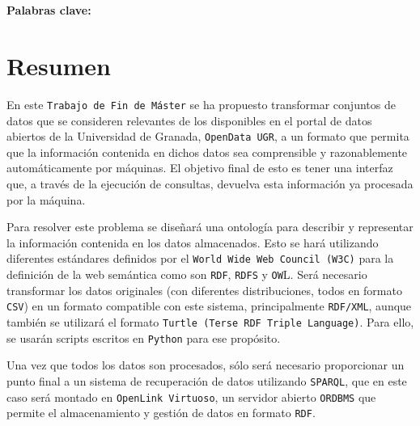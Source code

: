 \begin{center}
{\LARGE\bfseries\titulo}\\
\end{center}
\begin{center}
\autor\
\end{center}

\textbf{Palabras clave: }{\keywordsEs}

\section*{Resumen}


En este {\tt Trabajo de Fin de Máster} se ha propuesto transformar conjuntos de datos que se consideren relevantes de los disponibles en el portal de datos abiertos de la {Universidad de Granada}, {\tt OpenData UGR}, a un formato que permita que la información contenida en dichos datos sea comprensible y razonablemente automáticamente por máquinas. El objetivo final de esto es tener una interfaz que, a través de la ejecución de consultas, devuelva esta información ya procesada por la máquina.

\bigskip
Para resolver este problema se diseñará una ontología para describir y representar la información contenida en los datos almacenados. Esto se hará utilizando diferentes estándares definidos por el {\tt World Wide Web Council (W3C)} para la definición de la web semántica como son {\tt RDF}, {\tt RDFS} y {\tt OW}L. Será necesario transformar los datos originales (con diferentes distribuciones, todos en formato {\tt CSV}) en un formato compatible con este sistema, principalmente {\tt RDF/XML}, aunque también se utilizará el formato {\tt Turtle (Terse RDF Triple Language)}. Para ello, se usarán scripts escritos en {\tt Python} para ese propósito.

\bigskip
Una vez que todos los datos son procesados, sólo será necesario proporcionar un punto final a un sistema de recuperación de datos utilizando {\tt SPARQL}, que en este caso será montado en {\tt OpenLink Virtuoso}, un servidor abierto {\tt ORDBMS} que permite el almacenamiento y gestión de datos en formato {\tt RDF}.

\newpage
\begin{center}
{\LARGE\bfseries\tituloEng}\\
\end{center}
\begin{center}
\autor\
\end{center}


